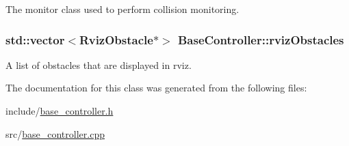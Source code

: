 The monitor class used to perform collision monitoring. 

\subsubsection[{\texorpdfstring{rviz\+Obstacles}{rvizObstacles}}]{\setlength{\rightskip}{0pt plus 5cm}std\+::vector$<${\bf Rviz\+Obstacle}$\ast$$>$ Base\+Controller\+::rviz\+Obstacles}\hypertarget{class_base_controller_abb0f1c2c9cbd953d95268ff4cb7ff3b4}{}\label{class_base_controller_abb0f1c2c9cbd953d95268ff4cb7ff3b4}


A list of obstacles that are displayed in rviz. 



The documentation for this class was generated from the following files\+:\begin{DoxyCompactItemize}
\item 
include/\hyperlink{base__controller_8h}{base\+\_\+controller.\+h}\item 
src/\hyperlink{base__controller_8cpp}{base\+\_\+controller.\+cpp}\end{DoxyCompactItemize}
